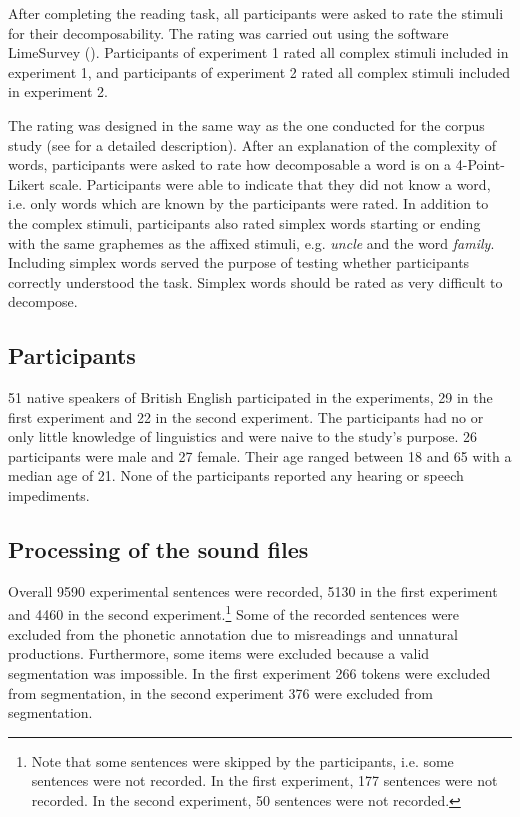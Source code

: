 After completing the reading task, all participants were asked to rate the stimuli for their decomposability. The rating was carried out using the software LimeSurvey (\citealt{LimeSurveyProjectTeam.2015}). Participants of experiment 1 rated all complex stimuli included in experiment 1, and participants of experiment 2 rated all complex stimuli included in experiment 2. 

The rating was designed in the same way as the one conducted for the corpus study (see  for a detailed description). After an explanation of the complexity of words, participants were asked to rate how decomposable a word is on a 4-Point-Likert scale. Participants were able to indicate that they did not know a word, i.e. only words which are known by the participants were rated. In addition to the complex stimuli, participants also rated simplex words starting or ending with the same graphemes as the affixed stimuli, e.g. \textit{{un}cle} and the word \textit{fami{ly}}. Including simplex words served the purpose of testing whether participants correctly understood the task. Simplex words should be rated as very difficult to decompose. 





	
	\subsection{Participants}
	
51 native speakers of British English participated in the experiments, 29 in the first experiment and 22 in the second experiment. The participants had no or only little knowledge of linguistics and were naive to the study's purpose. 26 participants were male and 27 female. Their age ranged between 18 and 65 with a median age of 21. None of the participants reported any hearing or speech impediments.
	


\subsection{Processing of the sound files}

Overall 9590 experimental sentences were recorded, 5130 in the first experiment and 4460 in the second experiment.\footnote{Note that some sentences were skipped by the participants, i.e. some sentences were not recorded. In the first experiment, 177 sentences were not recorded. In the second experiment, 50 sentences were not recorded. } 
Some of the recorded sentences were excluded from the phonetic annotation due to misreadings and unnatural productions. Furthermore, some items  were excluded because a valid segmentation was impossible. In the first experiment 266 tokens were excluded from segmentation, in the second experiment 376 were excluded from segmentation.



